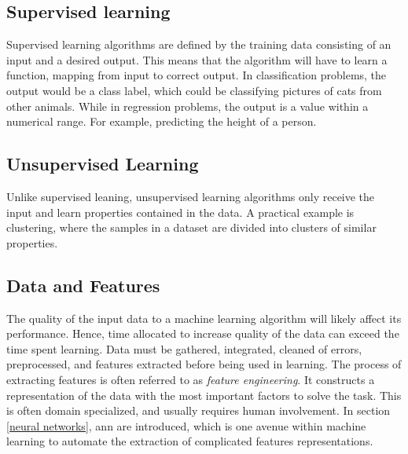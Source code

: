        \subsection{Supervised learning}
            Supervised learning  algorithms are defined by the training data consisting of an input and a desired output\cite{Goodfellow-et-al-2016_E}. This means that the algorithm will have to learn a function, mapping from input to correct output. In classification problems, the output would be a class label, which could be classifying pictures of cats from other animals. While in regression problems, the output is a value within a numerical range. For example, predicting the height of a person.
            
        \subsection{Unsupervised Learning}
            Unlike supervised leaning, unsupervised learning algorithms only receive the input and learn properties contained in the data\cite{Goodfellow-et-al-2016_E}. A practical example is clustering, where the samples in a dataset are divided into clusters of similar properties. 
                
    
    \subsection{Data and Features}
    The quality of the input data to a machine learning algorithm will likely affect its performance\cite{najafabadi2015deep}. Hence, time allocated to increase quality of the data can exceed the time spent learning.  Data must be gathered, integrated, cleaned of errors, preprocessed, and features extracted before being used in learning. The process of extracting features is often referred to as \textit{feature engineering}. It constructs a representation of the data with the most important factors to solve the task. This is often domain specialized, and usually requires human involvement. In section \ref{neural networks}, \gls{ann} are introduced, which is one avenue within machine learning to automate the extraction of complicated features representations.


